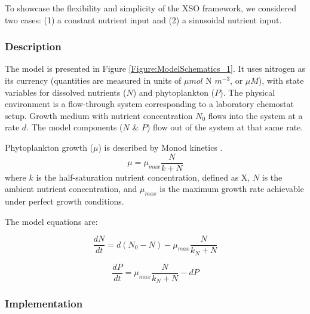 \documentclass[journal abbreviation, manuscript]{copernicus}
\begin{document}
To showcase the flexibility and simplicity of the XSO framework, we considered two cases: (1) a constant nutrient input and (2) a sinusoidal nutrient input.

\subsubsection{Description}
The model is presented in Figure \ref{Figure:ModelSchematics_1}. It uses nitrogen as its currency (quantities are measured in units of $\mu mol$ N $m^{-3}$, or $\mu M$), with state variables for dissolved nutrients ($N$) and phytoplankton ($P$). The physical environment is a flow-through system corresponding to a laboratory chemostat setup. Growth medium with nutrient concentration $N_0$ flows into the system at a rate $d$. The model components ($N$ \& $P$) flow out of the system at that same rate.

Phytoplankton growth ($\mu$) is described by Monod kinetics \citep{Monod1942RecherchesBacteriennes}.
\begin{equation}
    \mu = \mu_{max} \frac{N}{k + N} 
\end{equation}
where $k$ is the half-saturation nutrient concentration, defined as X, $N$ is the ambient nutrient concentration, and $\mu_{max}$ is the maximum growth rate achievable under perfect growth conditions.

The model equations are:

\begin{equation}
    \frac{d N}{d t} = 
    d (N_0 - N) %
    -  \mu_{max} \frac{N}{k_N + N} 
\end{equation}

\begin{equation}
    \frac{d P}{d t} =
    \mu_{max} \frac{N}{k_N + N} 
    - d P
\end{equation}



\subsubsection{Implementation}
\end{document}
